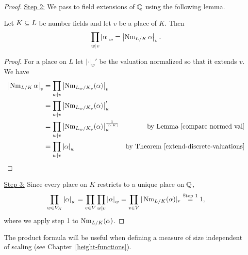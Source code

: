 \begin{proof}
\noindent\underline{Step 2:} We pass to field extensions of $\mathbb{Q}$ using the following lemma.
\begin{lem}
Let $K\subseteq L$ be number fields and let $v$ be a place of $K$.  Then
\[
\prod_{w\mid v} \left| {\alpha} \right|_w
=\left| {\operatorname{Nm}_{L/K}\alpha} \right|_v.
\]
\end{lem}
\begin{proof}
For a place on $L$ let $|\cdot|_w'$ be the valuation normalized so that it extends $v$. 
We have
\begin{align*}
\left| {\operatorname{Nm}_{L/K}\alpha} \right|_v&= \prod_{w\mid v} \left| {\operatorname{Nm}_{L_w/ K_v}(\alpha)} \right|_v\\
&= \prod_{w\mid v} \left| {\operatorname{Nm}_{L_w/ K_v}(\alpha)} \right|_{w}'\\
&= 
\prod_{w\mid v} \left| {\operatorname{Nm}_{L_w/ K_v}(\alpha)} \right|_{w}^{\frac{1}{[L:K]}}
&\text{by Lemma~\ref{compare-normed-val}}\\
&=\prod_{w\mid v}\left| {\alpha} \right|_w
&\text{by Theorem~\ref{extend-discrete-valuations}}
\qedhere
\end{align*}
\end{proof}

\noindent\underline{Step 3:} Since every place on $K$ restricts to a unique place on $\mathbb{Q}$,
\[
\prod_{w\in V_K} \left| {\alpha} \right|_w
=\prod_{v\in V} \prod_{w\mid v}\left| {\alpha} \right|_w
=\prod_{v\in V}|\operatorname{Nm}_{L/K}(\alpha)|_v\stackrel{\text{Step }1}=1,
\]
where we apply step 1 to $\operatorname{Nm}_{L/K}(\alpha)$.
\end{proof}
The product formula will be useful when defining a measure of size independent of scaling (see Chapter~\ref{height-functions}).
%
